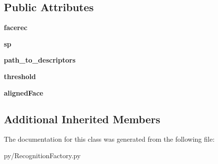 \subsection*{Public Attributes}
\begin{DoxyCompactItemize}
\item 
{\bfseries facerec}\hypertarget{classRecognitionFactory_1_1dLib_a6957e65ac5c057c4df83936944e779b5}{}\label{classRecognitionFactory_1_1dLib_a6957e65ac5c057c4df83936944e779b5}

\item 
{\bfseries sp}\hypertarget{classRecognitionFactory_1_1dLib_a0ac95514f25342efc41b1525381e1722}{}\label{classRecognitionFactory_1_1dLib_a0ac95514f25342efc41b1525381e1722}

\item 
{\bfseries path\+\_\+to\+\_\+descriptors}\hypertarget{classRecognitionFactory_1_1dLib_a895802c0f9f334eb0bd6c6decfe35a5e}{}\label{classRecognitionFactory_1_1dLib_a895802c0f9f334eb0bd6c6decfe35a5e}

\item 
{\bfseries threshold}\hypertarget{classRecognitionFactory_1_1dLib_aa3414f96351806052f4343677c34c4da}{}\label{classRecognitionFactory_1_1dLib_aa3414f96351806052f4343677c34c4da}

\item 
{\bfseries aligned\+Face}\hypertarget{classRecognitionFactory_1_1dLib_a9505ee9b34f1b5a70390e7fd137b02ee}{}\label{classRecognitionFactory_1_1dLib_a9505ee9b34f1b5a70390e7fd137b02ee}

\end{DoxyCompactItemize}
\subsection*{Additional Inherited Members}


The documentation for this class was generated from the following file\+:\begin{DoxyCompactItemize}
\item 
py/Recognition\+Factory.\+py\end{DoxyCompactItemize}

